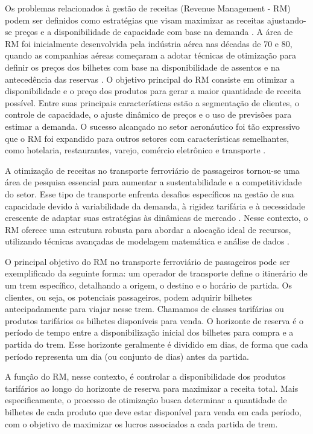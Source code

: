Os problemas relacionados à gestão de receitas (Revenue Management - RM) podem ser definidos como estratégias que visam maximizar as receitas ajustando-se preços e a disponibilidade de capacidade com base na demanda \citep{Gallego1994}. A área de RM foi inicialmente desenvolvida pela indústria aérea nas décadas de 70 e 80, quando as companhias aéreas começaram a adotar técnicas de otimização para definir os preços dos bilhetes com base na disponibilidade de assentos e na antecedência das reservas \citep{article_base}. O objetivo principal do RM consiste em otimizar a disponibilidade e o preço dos produtos para gerar a maior quantidade de receita possível. Entre suas principais características estão a segmentação de clientes, o controle de capacidade, o ajuste dinâmico de preços e o uso de previsões para estimar a demanda. O sucesso alcançado no setor aeronáutico foi tão expressivo que o RM foi expandido para outros setores com características semelhantes, como hotelaria, restaurantes, varejo, comércio eletrônico e transporte \citep{HEO2009446}.

A otimização de receitas no transporte ferroviário de passageiros tornou-se uma área de pesquisa essencial para aumentar a sustentabilidade e a competitividade do setor. Esse tipo de transporte enfrenta desafios específicos na gestão de sua capacidade devido à variabilidade da demanda, à rigidez tarifária e à necessidade crescente de adaptar suas estratégias às dinâmicas de mercado \citep{Guerriero2021}. Nesse contexto, o RM oferece uma estrutura robusta para abordar a alocação ideal de recursos, utilizando técnicas avançadas de modelagem matemática e análise de dados \citep{Ammirato2020}.

O principal objetivo do RM no transporte ferroviário de passageiros pode ser exemplificado da seguinte forma: um operador de transporte define o itinerário de um trem específico, detalhando a origem, o destino e o horário de partida. Os clientes, ou seja, os potenciais passageiros, podem adquirir bilhetes antecipadamente para viajar nesse trem. Chamamos de classes tarifárias ou produtos tarifários os bilhetes disponíveis para venda. O horizonte de reserva é o período de tempo entre a disponibilização inicial dos bilhetes para compra e a partida do trem. Esse horizonte geralmente é dividido em dias, de forma que cada período representa um dia (ou conjunto de dias) antes da partida.

A função do RM, nesse contexto, é controlar a disponibilidade dos produtos tarifários ao longo do horizonte de reserva para maximizar a receita total. Mais especificamente, o processo de otimização busca determinar a quantidade de bilhetes de cada produto que deve estar disponível para venda em cada período, com o objetivo de maximizar os lucros associados a cada partida de trem.

